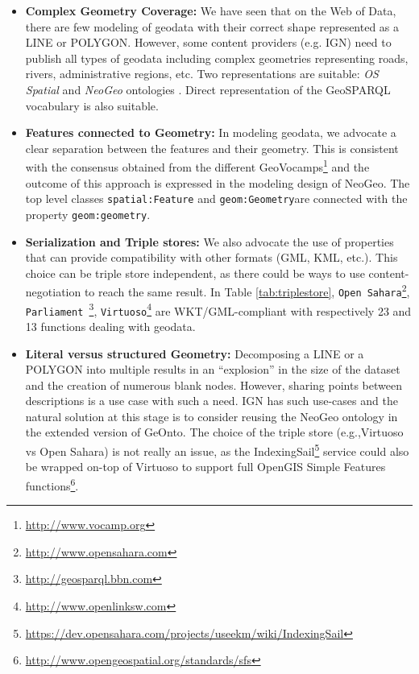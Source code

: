 \documentclass[a4paper,11pt]{report}
\begin{document}
\begin{itemize}
\item\textbf{Complex Geometry Coverage:} We have seen that on the Web of Data, there are few modeling of geodata with their correct shape represented as a LINE or POLYGON. However, some content providers (e.g. IGN) need to publish all types of geodata including complex geometries representing roads, rivers, administrative regions, etc. Two representations are suitable: \textit{OS Spatial} and \textit{NeoGeo} ontologies . Direct representation of the GeoSPARQL vocabulary is also suitable.
\item \textbf{Features connected to Geometry:} In modeling geodata, we advocate a clear separation between the features and their geometry. This is consistent with the consensus obtained from the different GeoVocamps\footnote{\url{http://www.vocamp.org}} and the outcome of this approach is expressed in the modeling design of NeoGeo. The top level classes \texttt{spatial:Feature} and \texttt{geom:Geometry}are connected with the property \texttt{geom:geometry}.
\item \textbf{Serialization and Triple stores:} We also advocate the use of properties that can provide compatibility with other formats (GML, KML, etc.). This choice can be triple store independent, as there could be ways to use content-negotiation to reach the same result. In Table \ref{tab:triplestore}, \texttt{Open Sahara}\footnote{\url{http://www.opensahara.com}}, \texttt{Parliament }\footnote{\url{http://geosparql.bbn.com}},  \texttt{Virtuoso}\footnote{\url{http://www.openlinksw.com}} are WKT/GML-compliant with respectively 23 and 13 functions dealing with geodata.
\item \textbf{Literal versus structured Geometry:} Decomposing a LINE or a POLYGON into multiple results in an ``explosion'' in the size of the dataset and the creation of numerous blank nodes. However, sharing points between descriptions is a use case with such a need. IGN has such use-cases and the natural solution at this stage is to consider reusing the NeoGeo ontology in the extended version of GeOnto. The choice of the triple store (e.g.,Virtuoso vs Open Sahara) is not really an issue, as the IndexingSail\footnote{\url{https://dev.opensahara.com/projects/useekm/wiki/IndexingSail}} service could also be wrapped on-top of Virtuoso to support full OpenGIS Simple Features functions\footnote{\url{http://www.opengeospatial.org/standards/sfs}}.
\end{itemize}
\end{document}
